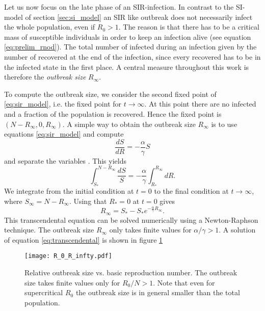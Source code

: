 \documentclass[openright,twoside,headsepline]{scrbook}
\begin{document}
Let us now focus on the late phase of an SIR-infection.
In contrast to the SI-model of section \ref{sec:si_model} an SIR like outbreak does not necessarily infect the whole population, even if $R_0>1$.
The reason is that there has to be a critical mass of susceptible individuals in order to keep an infection alive (see equation \eqref{eq:prelim_rnod}).
The total number of infected during an infection given by the number of recovered at the end of the infection, since every recovered has to be in the infected state in the first place.
A central measure throughout this work is therefore the \emph{outbreak size} $R_\infty$.

To compute the outbreak size, we consider the second fixed point of \eqref{eq:sir_model}, i.e. the fixed point for $t \rightarrow \infty $.
At this point there are no infected and a fraction of the population is recovered.
Hence the fixed point is $(N-R_\infty , 0, R_\infty )$.
A simple way to obtain the outbreak size $R_\infty $ is to use equations \eqref{eq:sir_model} and compute 
$$
\frac{dS}{dR}=-\frac{\alpha }{\gamma } S 
$$
and separate the variables \cite{Chasnov:2010}.
This yields
$$
\int _{S_*} ^{N-R_\infty} \frac{dS}{S}=-\frac{\alpha }{\gamma } \int _{R_*} ^{R_\infty} dR .
$$
We integrate from the initial condition at $t=0$ to the final condition at $t \rightarrow \infty$, where $S_\infty = N-R_\infty $.
Using that $R_* =0$ at $t=0$ gives 
\begin{equation}\label{eq:transcendental}
R_\infty = S_*-S_* e ^{-\frac{\alpha}{\gamma}R_\infty}.
\end{equation}
This transcendental equation can be solved numerically using a Newton-Raphson technique.
The outbreak size $R_\infty $ only takes finite values for $\alpha / \gamma > 1$.
A solution of equation \eqref{eq:transcendental} is shown in figure \ref{fig:transcendental}
%
\begin{figure}[htbp]
\begin{center}
\texttt{[image: R\_0\_R\_infty.pdf]}
\caption{Relative outbreak size vs. basic reproduction number.
The outbreak size takes finite values only for $R_0/N >1$.
Note that even for supercritical $R_0$ the outbreak size is in general smaller than the total population.
}
\label{fig:transcendental}
\end{center}
\end{figure}
\end{document}
